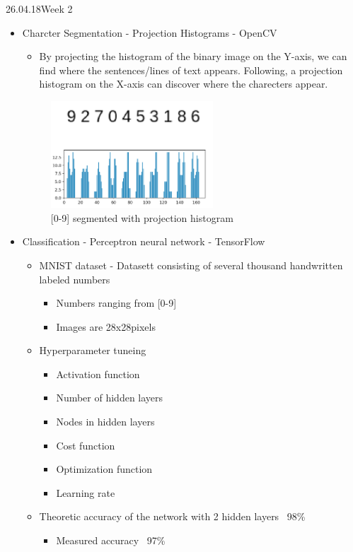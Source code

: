 \documentclass[11pt,a4paper,UKenglish]{article}
\begin{document}
\newpage
\begin{loggentry}{26.04.18}{Week 2}
\begin{itemize}
  \item{Charcter Segmentation - Projection Histograms - OpenCV}
  \begin{itemize}
    \item{By projecting the histogram of the binary image on the Y-axis,
    we can find where the sentences/lines of text appears. Following, a
    projection histogram on the X-axis can discover where the charecters
    appear.}
  \end{itemize}

  \begin{figure}[H]
    \centering
    \includegraphics[height=4cm]{../res/0-9_segmented_out.png}
    \caption{[0-9] segmented with projection histogram}
    \label{fig:0-9_segmented_out}
  \end{figure}

  \item{Classification - Perceptron neural network - TensorFlow}
    \begin{itemize}
      \item{MNIST dataset - Datasett consisting of several thousand handwritten
      labeled numbers}
      \begin{itemize}
        \item{Numbers ranging from [0-9]}
        \item{Images are 28x28pixels}
      \end{itemize}
      \item{Hyperparameter tuneing}
      \begin{itemize}
        \item{Activation function}
        \item{Number of hidden layers}
        \item{Nodes in hidden layers}
        \item{Cost function}
        \item{Optimization function}
        \item{Learning rate}
      \end{itemize}
      \item{Theoretic accuracy of the network with 2 hidden layers ~98\%}
      \begin{itemize}
        \item{Measured accuracy ~97\%}


\end{itemize}
\end{itemize}
\end{itemize}
\end{loggentry}
\end{document}
